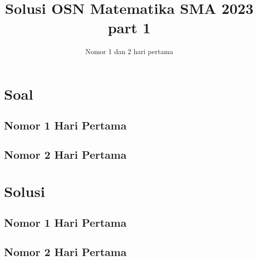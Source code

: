 \documentclass[12pt]{scrartcl}
\title{Solusi OSN Matematika SMA 2023 part 1}
\author{Nomor 1 dan 2 hari pertama}
\date{}
\begin{document}
\maketitle

\renewcommand*\contentsname{Daftar Isi}
\tableofcontents

\newpage
\newpage
\section{Soal}
\subsection{Nomor 1 Hari Pertama}

\subsection{Nomor 2 Hari Pertama}


\section{Solusi}
\subsection{Nomor 1 Hari Pertama}

\subsection{Nomor 2 Hari Pertama}

\end{document}
